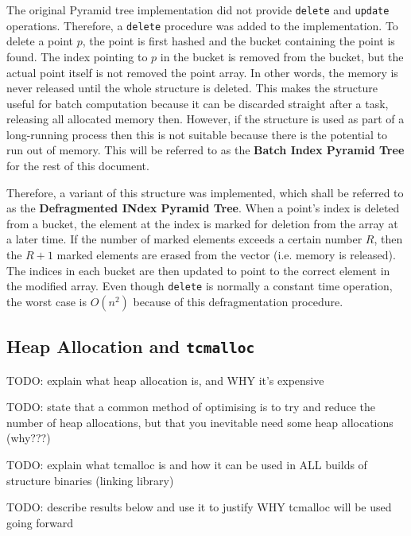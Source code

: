 The original Pyramid tree implementation did not provide \texttt{delete} and \texttt{update} operations. Therefore, a \texttt{delete} procedure was added to the implementation. To delete a point $p$, the point is first hashed and the bucket containing the point is found. The index pointing to $p$ in the bucket is removed from the bucket, but the actual point itself is not removed the point array. In other words, the memory is never released until the whole structure is deleted. This makes the structure useful for batch computation because it can be discarded straight after a task, releasing all allocated memory then. However, if the structure is used as part of a long-running process then this is not suitable because there is the potential to run out of memory. This will be referred to as the \textbf{Batch Index Pyramid Tree} for the rest of this document.

Therefore, a variant of this structure was implemented, which shall be referred to as the \textbf{Defragmented INdex Pyramid Tree}. When a point's index is deleted from a bucket, the element at the index is marked for deletion from the array at a later time. If the number of marked elements exceeds a certain number $R$, then the $R + 1$ marked elements are erased from the vector (i.e. memory is released). The indices in each bucket are then updated to point to the correct element in the modified array. Even though \texttt{delete} is normally a constant time operation, the worst case is $O(n^2)$ because of this defragmentation procedure.

\subsection{Heap Allocation and \texttt{tcmalloc}}

TODO: explain what heap allocation is, and WHY it's expensive

TODO: state that a common method of optimising is to try and reduce the number of heap allocations, but that you inevitable need some heap allocations (why???)

TODO: explain what tcmalloc is and how it can be used in ALL builds of structure binaries (linking library)

TODO: describe results below and use it to justify WHY tcmalloc will be used going forward

